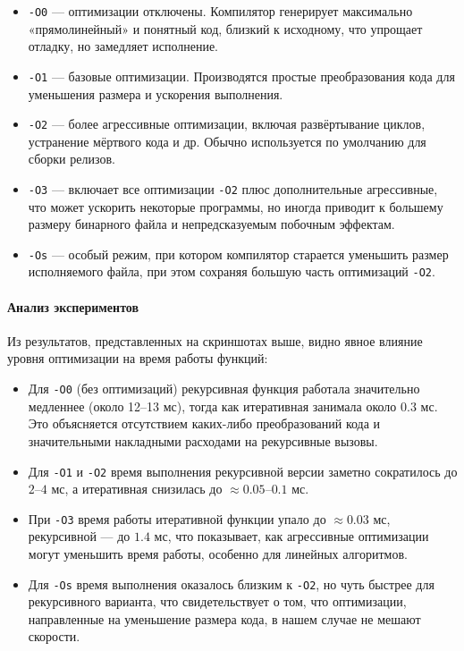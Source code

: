 \begin{itemize}
    \item \texttt{-O0} — оптимизации отключены. Компилятор генерирует максимально «прямолинейный» и понятный код, близкий к исходному, что упрощает отладку, но замедляет исполнение.
    \item \texttt{-O1} — базовые оптимизации. Производятся простые преобразования кода для уменьшения размера и ускорения выполнения.
    \item \texttt{-O2} — более агрессивные оптимизации, включая развёртывание циклов, устранение мёртвого кода и др. Обычно используется по умолчанию для сборки релизов.
    \item \texttt{-O3} — включает все оптимизации \texttt{-O2} плюс дополнительные агрессивные, что может ускорить некоторые программы, но иногда приводит к большему размеру бинарного файла и непредсказуемым побочным эффектам.
    \item \texttt{-Os} — особый режим, при котором компилятор старается уменьшить размер исполняемого файла, при этом сохраняя большую часть оптимизаций \texttt{-O2}.
\end{itemize}

\paragraph*{Анализ экспериментов}

Из результатов, представленных на скриншотах выше, видно явное влияние уровня оптимизации на время работы функций:

\begin{itemize}
    \item Для \texttt{-O0} (без оптимизаций) рекурсивная функция работала значительно медленнее (около 12--13 мс), тогда как итеративная занимала около $0.3$ мс. Это объясняется отсутствием каких-либо преобразований кода и значительными накладными расходами на рекурсивные вызовы.
    
    \item Для \texttt{-O1} и \texttt{-O2} время выполнения рекурсивной версии заметно сократилось до $2$--$4$ мс, а итеративная снизилась до $\approx 0.05$--$0.1$ мс.
    
    \item При \texttt{-O3} время работы итеративной функции упало до $\approx 0.03$ мс, рекурсивной — до $1.4$ мс, что показывает, как агрессивные оптимизации могут уменьшить время работы, особенно для линейных алгоритмов.
    
    \item Для \texttt{-Os} время выполнения оказалось близким к \texttt{-O2}, но чуть быстрее для рекурсивного варианта, что свидетельствует о том, что оптимизации, направленные на уменьшение размера кода, в нашем случае не мешают скорости.
\end{itemize}

